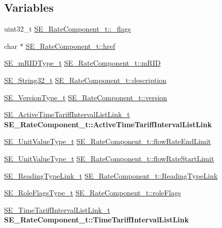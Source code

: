 \subsection*{Variables}
\begin{DoxyCompactItemize}
\item 
uint32\+\_\+t \hyperlink{group__RateComponent_ga0c08e678db37ea8eb9fd67e3fcae4782}{S\+E\+\_\+\+Rate\+Component\+\_\+t\+::\+\_\+flags}
\item 
char $\ast$ \hyperlink{group__RateComponent_gaac1c4959b218d838c1b20379915e3abc}{S\+E\+\_\+\+Rate\+Component\+\_\+t\+::href}
\item 
\hyperlink{group__mRIDType_gac74622112f3a388a2851b2289963ba5e}{S\+E\+\_\+m\+R\+I\+D\+Type\+\_\+t} \hyperlink{group__RateComponent_ga5febd8e03509ea29e372b4a5863809b6}{S\+E\+\_\+\+Rate\+Component\+\_\+t\+::m\+R\+ID}
\item 
\hyperlink{group__String32_gac9f59b06b168b4d2e0d45ed41699af42}{S\+E\+\_\+\+String32\+\_\+t} \hyperlink{group__RateComponent_gab7842f1806d07c3750119171d5637ced}{S\+E\+\_\+\+Rate\+Component\+\_\+t\+::description}
\item 
\hyperlink{group__VersionType_ga4b8d27838226948397ed99f67d46e2ae}{S\+E\+\_\+\+Version\+Type\+\_\+t} \hyperlink{group__RateComponent_ga0d6a6b7bf2528185f64ae073eabea734}{S\+E\+\_\+\+Rate\+Component\+\_\+t\+::version}
\item 
\mbox{\label{group__RateComponent_ga220f509fe42ffcf555d04cbf6718c3aa}} 
\hyperlink{structSE__ActiveTimeTariffIntervalListLink__t}{S\+E\+\_\+\+Active\+Time\+Tariff\+Interval\+List\+Link\+\_\+t} {\bfseries S\+E\+\_\+\+Rate\+Component\+\_\+t\+::\+Active\+Time\+Tariff\+Interval\+List\+Link}
\item 
\hyperlink{structSE__UnitValueType__t}{S\+E\+\_\+\+Unit\+Value\+Type\+\_\+t} \hyperlink{group__RateComponent_ga51e5dd2544cb9bb2fc30c5254f13ed7e}{S\+E\+\_\+\+Rate\+Component\+\_\+t\+::flow\+Rate\+End\+Limit}
\item 
\hyperlink{structSE__UnitValueType__t}{S\+E\+\_\+\+Unit\+Value\+Type\+\_\+t} \hyperlink{group__RateComponent_ga4b5a6f687822495416f526dfd0f07575}{S\+E\+\_\+\+Rate\+Component\+\_\+t\+::flow\+Rate\+Start\+Limit}
\item 
\hyperlink{structSE__ReadingTypeLink__t}{S\+E\+\_\+\+Reading\+Type\+Link\+\_\+t} \hyperlink{group__RateComponent_ga108a8aae6b28aac45112a19b50ac3da0}{S\+E\+\_\+\+Rate\+Component\+\_\+t\+::\+Reading\+Type\+Link}
\item 
\hyperlink{group__RoleFlagsType_gac20b70bba5dd7d6773b13d69c372c957}{S\+E\+\_\+\+Role\+Flags\+Type\+\_\+t} \hyperlink{group__RateComponent_ga8641fd093a5e97212c53250b6509c5ed}{S\+E\+\_\+\+Rate\+Component\+\_\+t\+::role\+Flags}
\item 
\mbox{\label{group__RateComponent_gab2020c72658c9efa668591b44fbac702}} 
\hyperlink{structSE__TimeTariffIntervalListLink__t}{S\+E\+\_\+\+Time\+Tariff\+Interval\+List\+Link\+\_\+t} {\bfseries S\+E\+\_\+\+Rate\+Component\+\_\+t\+::\+Time\+Tariff\+Interval\+List\+Link}
\end{DoxyCompactItemize}


